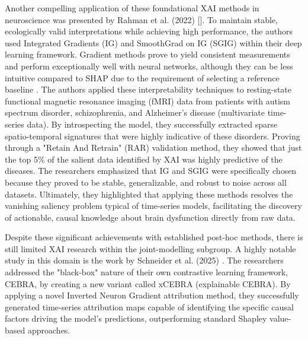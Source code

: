 \documentclass{article}
\begin{document}
Another compelling application of these foundational XAI methods in neuroscience was presented by Rahman et al. (2022) [\cite{rahman2022interpreting}]. To maintain stable, ecologically valid interpretations while achieving high performance, the authors used Integrated Gradients (IG) and SmoothGrad on IG (SGIG) within their deep learning framework. Gradient methods prove to yield consistent measurements and perform exceptionally well with neural networks, although they can be less intuitive compared to SHAP due to the requirement of selecting a reference baseline \cite{alharthi2025explainable}. The authors applied these interpretability techniques to resting-state functional magnetic resonance imaging (fMRI) data from patients with autism spectrum disorder, schizophrenia, and Alzheimer's disease (multivariate time-series data). By introspecting the model, they successfully extracted sparse spatio-temporal signatures that were highly indicative of these disorders. Proving through a "Retain And Retrain" (RAR) validation method, they showed that just the top 5\% of the salient data identified by XAI was highly predictive of the diseases. The researchers emphasized that IG and SGIG were specifically chosen because they proved to be stable, generalizable, and robust to noise across all datasets. Ultimately, they highlighted that applying these methods resolves the vanishing saliency problem typical of time-series models, facilitating the discovery of actionable, causal knowledge about brain dysfunction directly from raw data.

Despite these significant achievements with established post-hoc methods, there is still limited XAI research within the joint-modelling subgroup. A highly notable study in this domain is the work by Schneider et al. (2025) \cite{schneider2025time}. The researchers addressed the "black-box" nature of their own contrastive learning framework, CEBRA, by creating a new variant called xCEBRA (explainable CEBRA). By applying a novel Inverted Neuron Gradient attribution method, they successfully generated time-series attribution maps capable of identifying the specific causal factors driving the model's predictions, outperforming standard Shapley value-based approaches.
\end{document}
